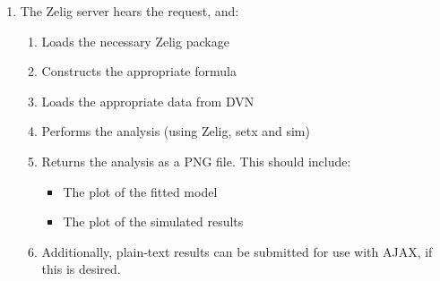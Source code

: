 \documentclass{article}
\begin{document}
\begin{enumerate}
  \item The Zelig server hears the request, and:
    \begin{enumerate}
      \item Loads the necessary Zelig package
      \item Constructs the appropriate formula
      \item Loads the appropriate data from DVN
      \item Performs the analysis (using Zelig, setx and sim)
      \item Returns the analysis as a PNG file. This should include:
        \begin{itemize}
          \item The plot of the fitted model
          \item The plot of the simulated results
        \end{itemize}
      \item Additionally, plain-text results can be submitted for use with
        AJAX, if this is desired.
    \end{enumerate}
\end{enumerate}
\end{document}
